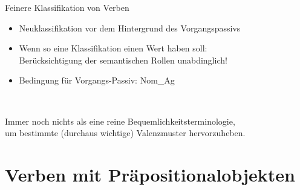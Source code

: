 \begin{frame}
  {Feinere Klassifikation von Verben}
  \pause
  \begin{itemize}[<+->]
    \item Neuklassifikation vor dem Hintergrund des Vorgangspassivs
    \item Wenn so eine Klassifikation einen Wert haben soll:\\
      \alert{Berücksichtigung der semantischen Rollen unabdinglich!}
    \item Bedingung für Vorgangs-Passiv: \alert{Nom\_Ag}
  \end{itemize} 
  \pause
  \Zeile
  \centering
  \\
  \raggedright
  \Zeile
  \pause
  Immer noch nichts als eine reine Bequemlichkeitsterminologie,\\
  um bestimmte (durchaus wichtige) Valenzmuster hervorzuheben.
\end{frame}

\section{Verben mit Präpositionalobjekten}

